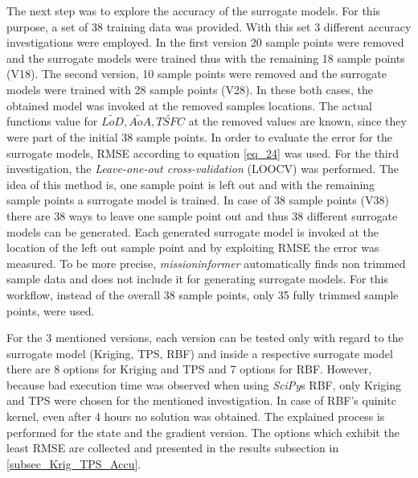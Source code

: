 The next step was to explore the accuracy of 
the surrogate models. For this purpose, 
a set of 38 training data was provided. With 
this set 3 different accuracy investigations were employed.
In the first version 20 sample points were 
removed and the surrogate models were trained 
thus with the remaining 18 sample points 
(V18). The second version, 10 sample 
points were removed and the surrogate models 
were trained with 28 sample points (V28).
In these both cases, the obtained 
model was invoked at the removed samples locations.
The actual functions value for 
$\tilde{LoD}, \tilde{AoA}, \tilde{TSFC}$
at the removed values are known, since
they were part of the initial 38 sample 
points. In order to evaluate 
the error for the surrogate models, 
RMSE according to equation \eqref{eq_24}
was used. For the third investigation, 
the \emph{Leave-one-out cross-validation}
(LOOCV) was performed. The idea 
of this method is, one sample point 
is left out and with the remaining 
sample points a surrogate model is 
trained. In case of 38 sample 
points (V38) there are 38 ways 
to leave one sample point out and 
thus 38 different surrogate models 
can be generated. Each 
generated surrogate model is 
invoked at the
location of the left out sample point
and by exploiting RMSE the error 
was measured.
To be more precise, \emph{missioninformer} 
automatically finds non trimmed sample data and 
does not include it for generating surrogate models.
For this workflow, instead of the overall 38 
sample points, only 35 fully trimmed 
sample points,  were used.  \newline

For the 3 
mentioned versions, each version can 
be tested only with regard to the surrogate 
model (Kriging, TPS, RBF) and inside 
a respective surrogate model there are 
8 options for Kriging and TPS and 7 
options for RBF. However, because 
bad execution time was observed when 
using \emph{SciPy}s RBF, only Kriging and TPS 
were chosen for the mentioned investigation.
In case of RBF's quinitc kernel, even 
after 4 hours no solution was obtained.
The explained process is performed 
for the state and the gradient version.
The options which exhibit the least 
RMSE are collected and presented in the 
results subsection in \ref{subsec_Krig_TPS_Accu}.
